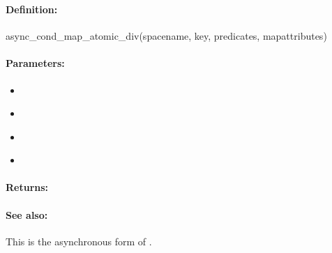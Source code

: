 \pagebreak
\subsubsection{}
\label{api:ruby:async_cond_map_atomic_div}


\paragraph{Definition:}
\begin{rubycode}
async_cond_map_atomic_div(spacename, key, predicates, mapattributes)
\end{rubycode}

\paragraph{Parameters:}
\begin{itemize}[noitemsep]
\item {}\\

\item {}\\

\item {}\\

\item {}\\

\end{itemize}

\paragraph{Returns:}


\paragraph{See also:}  This is the asynchronous form of .

\pagebreak
\subsubsection{}
\label{api:ruby:map_atomic_mod}


